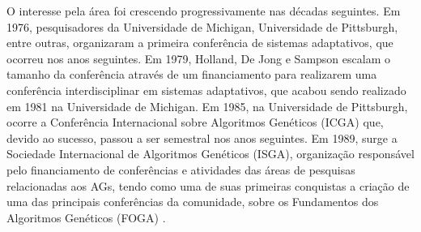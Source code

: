 O interesse pela área foi crescendo progressivamente nas décadas seguintes. Em 1976, pesquisadores da Universidade de Michigan, Universidade de Pittsburgh, entre outras, organizaram a primeira conferência de sistemas adaptativos, que ocorreu nos anos seguintes. Em 1979, Holland, De Jong e Sampson escalam o tamanho da conferência através de um financiamento para realizarem uma conferência interdisciplinar em sistemas adaptativos, que acabou sendo realizado em 1981 na Universidade de Michigan. Em 1985, na Universidade de Pittsburgh, ocorre a Conferência Internacional sobre Algoritmos Genéticos (ICGA) que, devido ao sucesso, passou a ser semestral nos anos seguintes. Em 1989, surge a Sociedade Internacional de Algoritmos Genéticos (ISGA), organização responsável pelo financiamento de conferências e atividades das áreas de pesquisas relacionadas aos AGs, tendo como uma de suas primeiras conquistas a criação de uma das principais conferências da comunidade, sobre os Fundamentos dos Algoritmos Genéticos (FOGA) \cite[pg.A2.3:5]{back_handbook_1997}.
